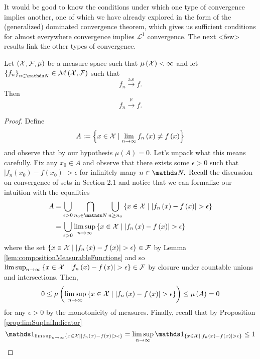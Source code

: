 It would be good to know the conditions under which one type of convergence
implies another, one of which we have already explored in the form
of the (generalized) dominated convergence theorem, which gives us
sufficient conditions for almost everywhere convergence implies $\mathcal{L}^{1}$
convergence. The next <few> results link the other types of convergence.
\begin{prop}
\label{prop:finiteMeasuresAEimpliesConvInMeasures}Let $\left(\mathcal{X},\mathcal{F},\mu\right)$
be a measure space such that $\mu\left(\mathcal{X}\right)<\infty$ and let
$\left\{ f_{n}\right\} _{n\in\N}\in\measurableFunctions$ such that
\[
f_{n}\stackrel{\text{a.e}}{\longrightarrow}f.
\]
Then
\[
f_{n}\stackrel{\mu}{\longrightarrow}f.
\]
\end{prop}

\begin{proof}
Define 
\[
A:=\left\{ x\in\mathcal{X}\mid\lim_{n\to\infty}f_{n}\left(x\right)\neq f\left(x\right)\right\} 
\]
and observe that by our hypothesis $\mu\left(A\right)=0.$ Let's unpack
what this means carefully. Fix any $x_{0}\in A$ and observe that
there exists some $\epsilon>0$ such that $\lvert f_{n}\left(x_{0}\right)-f\left(x_{0}\right)\rvert>\epsilon$
for infinitely many $n\in\N.$ Recall the discussion on convergence
of sets in Section 2.1 and notice that we can formalize our intuition
with the equalities
\begin{align*}
A & =\bigcup_{\epsilon>0}\bigcap_{n_{0}\in\N}\bigcup_{n\geq n_{0}}\left\{ x\in\X\mid\lvert f_{n}\left(x\right)-f\left(x\right)\rvert>\epsilon\right\} \\
 & =\bigcup_{\epsilon>0}\limsup_{n\to\infty}\left\{ x\in\X\mid\lvert f_{n}\left(x\right)-f\left(x\right)\rvert>\epsilon\right\} 
\end{align*}
where the set $\left\{ x\in\mathcal{X}\mid\lvert f_{n}\left(x\right)-f\left(x\right)\rvert>\epsilon\right\} \in\mathcal{F}$
by Lemma \ref{lem:compositionMeasurableFunctions} and so $\limsup_{n\to\infty}\left\{ x\in\mathcal{X}\mid\lvert f_{n}\left(x\right)-f\left(x\right)\rvert>\epsilon\right\} \in\mathcal{F}$
by closure under countable unions and intersections. Then,
\[
0\leq\mu\left(\limsup_{n\to\infty}\left\{ x\in\mathcal{X}\mid\lvert f_{n}\left(x\right)-f\left(x\right)\rvert>\epsilon\right\} \right)\leq\mu\left(A\right)=0
\]
for any $\epsilon>0$ by the monotonicity of measures. Finally, recall
that by Proposition \ref{prop:limSupInfIndicator}
\[
\indicate_{\limsup_{n\to\infty}\left\{ x\in\X\mid\lvert f_{n}\left(x\right)-f\left(x\right)\rvert>\epsilon\right\} }=\limsup_{n\to\infty}\indicate_{\left\{ x\in\X\mid\lvert f_{n}\left(x\right)-f\left(x\right)\rvert>\epsilon\right\} }\leq1
\]
\end{proof}
